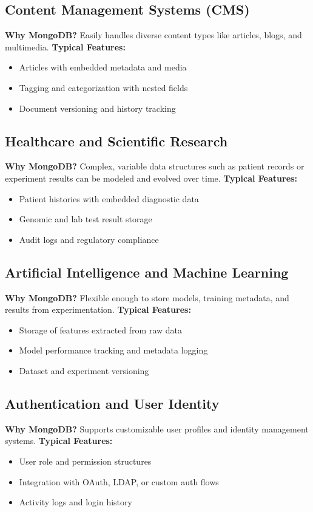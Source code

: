 \documentclass{article}
\begin{document}
\subsection*{Content Management Systems (CMS)}
\textbf{Why MongoDB?} Easily handles diverse content types like articles, blogs, and multimedia.
\textbf{Typical Features:}
\begin{itemize}
    \item Articles with embedded metadata and media
    \item Tagging and categorization with nested fields
    \item Document versioning and history tracking
\end{itemize}

\subsection*{Healthcare and Scientific Research}
\textbf{Why MongoDB?} Complex, variable data structures such as patient records or experiment results can be modeled and evolved over time.
\textbf{Typical Features:}
\begin{itemize}
    \item Patient histories with embedded diagnostic data
    \item Genomic and lab test result storage
    \item Audit logs and regulatory compliance
\end{itemize}

\subsection*{Artificial Intelligence and Machine Learning}
\textbf{Why MongoDB?} Flexible enough to store models, training metadata, and results from experimentation.
\textbf{Typical Features:}
\begin{itemize}
    \item Storage of features extracted from raw data
    \item Model performance tracking and metadata logging
    \item Dataset and experiment versioning
\end{itemize}

\subsection*{Authentication and User Identity}
\textbf{Why MongoDB?} Supports customizable user profiles and identity management systems.
\textbf{Typical Features:}
\begin{itemize}
    \item User role and permission structures
    \item Integration with OAuth, LDAP, or custom auth flows
    \item Activity logs and login history
\end{itemize}
\end{document}
